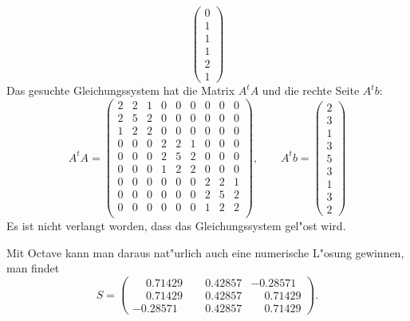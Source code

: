 \begin{loesung}
\[\begin{pmatrix}
0\\1\\1\\
1\\2\\1
\end{pmatrix}
\]
Das gesuchte Gleichungssystem hat die Matrix $A^tA$ und die rechte
Seite $A^tb$:
\[
A^tA
=
\begin{pmatrix}
2&2&1&0&0&0&0&0&0\\
2&5&2&0&0&0&0&0&0\\
1&2&2&0&0&0&0&0&0\\
%
0&0&0&2&2&1&0&0&0\\
0&0&0&2&5&2&0&0&0\\
0&0&0&1&2&2&0&0&0\\
%
0&0&0&0&0&0&2&2&1\\
0&0&0&0&0&0&2&5&2\\
0&0&0&0&0&0&1&2&2\\
\end{pmatrix}
,\qquad
A^tb=\begin{pmatrix}2\\3\\1\\3\\5\\3\\1\\3\\2\end{pmatrix}
\]
Es ist nicht verlangt worden, dass das Gleichungssystem gel"ost wird.
\end{loesung}

\begin{diskussion}
Mit Octave kann man daraus nat"urlich auch eine numerische L"osung gewinnen,
man findet
\[
S=\begin{pmatrix}
\phantom{-}0.71429& \phantom{-}0.42857&           -0.28571\\
\phantom{-}0.71429& \phantom{-}0.42857& \phantom{-}0.71429\\
          -0.28571& \phantom{-}0.42857& \phantom{-}0.71429
\end{pmatrix}.
\]
\end{diskussion}





